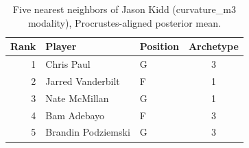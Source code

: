 \begin{table}[htbp]
  \centering\small
  \begin{tabular}{rllc}
    \toprule
    Rank & Player & Position & Archetype \\
    \midrule
    1 & Chris Paul & G & 3 \\
    2 & Jarred Vanderbilt & F & 1 \\
    3 & Nate McMillan & G & 1 \\
    4 & Bam Adebayo & F & 3 \\
    5 & Brandin Podziemski & G & 3 \\
    \bottomrule
  \end{tabular}
  \caption{Five nearest neighbors of Jason Kidd (curvature_m3 modality), Procrustes-aligned posterior mean.}
  \label{tab:Jason_Kidd_neighbors_curvature_m3}
\end{table}

